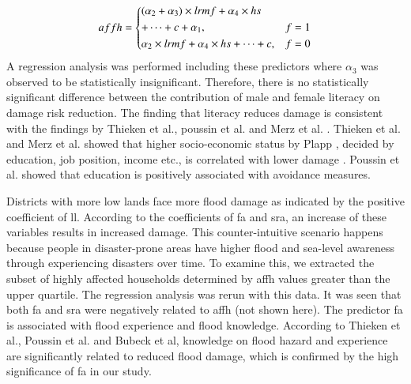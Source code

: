 \documentclass[preprint,review,12pt]{elsarticle}
\begin{document}
\begin{equation}
affh= 
\begin{dcases}
(\alpha_{2}+\alpha_{3}) \times lrmf+\alpha_{4} \times hs \\
+\cdots + c+\alpha_{1}
, & f=1 \\
\alpha_{2} \times lrmf+ \alpha_{4} \times hs + \cdots + c , & f=0 \\
\end{dcases}
\label{femcase}
\end{equation}
A regression analysis was performed including these predictors where $\alpha_{3}$ was observed to be statistically insignificant. Therefore, there is no statistically significant difference between the contribution of male and female literacy on damage risk reduction. The finding that literacy reduces damage is consistent with the findings by Thieken et al., poussin et al. and Merz et al. \cite{thieken2005flood, poussin2014factors, merz2013multi}. Thieken et al. and Merz et al. showed that higher socio-economic status by Plapp \cite{plapp2004wahrnehmung}, decided by education, job position, income etc., is correlated with lower damage \cite{thieken2005flood, merz2013multi}. Poussin et al. showed that education is positively associated with avoidance measures.    

Districts with more low lands face more flood damage as indicated by the positive coefficient of ll. According to the coefficients of fa and sra, an increase of these variables results in increased damage. This counter-intuitive scenario happens because people in disaster-prone areas have higher flood and sea-level awareness through experiencing disasters over time. To examine this, we extracted the subset of highly affected households determined by affh values greater than the upper quartile. The regression analysis was rerun with this data. It was seen that both fa and sra were negatively related to affh (not shown here). The predictor fa is associated with flood experience and flood knowledge. According to Thieken et al., Poussin et al. and Bubeck et al, knowledge on flood hazard and experience are significantly related to reduced flood damage, which is confirmed by the high significance of fa in our study.  
\end{document}
